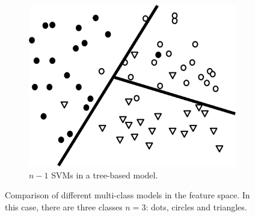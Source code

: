 \begin{figure}
\begin{subfigure}[b]{0.32\textwidth}
            \centering 
            \includegraphics[width=.98\textwidth]{parts/chap-2/img-2/svm-seq.png}
            \caption{$n-1$ SVMs in a tree-based model.} 
            \label{mach:svm-model-gr-3}
        \end{subfigure}
        \caption[Comparison of different multi-class models]{Comparison of different multi-class models in the feature space. In this case, there are three classes $n=3$: dots, circles and triangles.}
\end{figure}